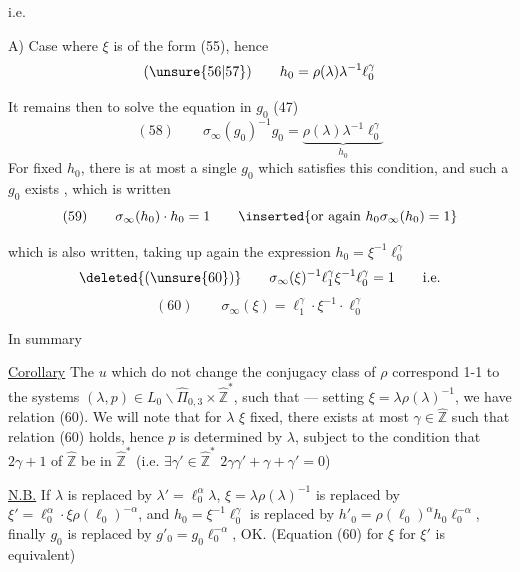 i.e. 


A) Case  where $\xi$ is of the form (55), hence
\[
(\unsure{56|57})\qquad h_0=\rho(\lambda)\lambda^{-1}\ell_0^\gamma
\]


It remains then to solve the equation in $g_0$ (47)
\[
(58)\qquad
\sigma_\infty(g_0)^{-1}g_0
=\underbrace{\rho(\lambda)\lambda^{-1}\ell_0^\gamma}_{h_0}
\]
For  fixed $h_0$, there is at most a single $g_0$ which satisfies this condition, and such a $g_0$ exists  , which is written
\[
(59)\qquad \sigma_\infty(h_0)\cdot h_0=1
\qquad\inserted{\text{or again }h_0\sigma_\infty(h_0)=1}
\]

which is also written, taking up again the expression $h_0=\xi^{-1}\ell_0^\gamma$
\[
\deleted{(\unsure{60})}\qquad
\sigma_\infty(\xi)^{-1}\ell_1^\gamma\xi^{-1}\ell_0^\gamma=1
\qquad\text{i.e.}
\]
\[
(60)\qquad \sigma_\infty(\xi)=\ell_1^\gamma\cdot\xi^{-1}\cdot\ell_0^\gamma
\]

In summary

\uline{Corollary} The $u$ which do not change the conjugacy class of $\rho$  correspond 1-1 to the systems $(\lambda,p)\in L_0\backslash\widehat{\Pi}_{0,3}\times\widehat{\mathbb Z}^{*}$, such that --- setting $\xi=\lambda\rho(\lambda)^{-1}$,  we have relation (60).
We will note that for $\lambda$  $\xi$ fixed, there exists at most  $\gamma\in\widehat{\mathbb Z}$ such that relation (60) holds, hence $p$ is determined by $\lambda$, subject to the  condition that  $2\gamma+1$ of $\widehat{\mathbb Z}$ be in $\widehat{\mathbb Z}^{*}$ (i.e. $\exists\gamma'\in\widehat{\mathbb Z}^{*}$  $2\gamma\gamma'+\gamma+\gamma'=0$)


\uline{N.B.} If $\lambda$ is replaced by $\lambda'=\ell_0^\alpha\lambda$, $\xi=\lambda\rho(\lambda)^{-1}$ is replaced by $\xi'=\ell_0^\alpha\cdot\xi\rho(\ell_0)^{-\alpha}$, and $h_0=\xi^{-1}\ell_0^\gamma$ is replaced by $h'_0=\rho(\ell_0)^\alpha h_0\ell_0^{-\alpha}$, finally $g_0$ is replaced by $g'_0=g_0\ell_0^{-\alpha}$, OK. \unsure{!} (Equation (60) for $\xi$  for $\xi'$ is equivalent)

